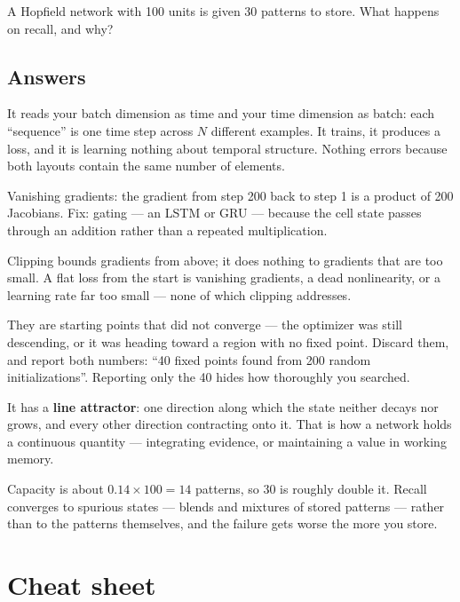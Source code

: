 \documentclass[11pt]{article}
\begin{document}
 A Hopfield network with 100 units is given 30 patterns to store. What
happens on recall, and why?

\subsection*{Answers}

 It reads your batch dimension as time and your time dimension as batch:
each ``sequence'' is one time step across $N$ different examples. It trains, it
produces a loss, and it is learning nothing about temporal structure. Nothing
errors because both layouts contain the same number of elements.

 Vanishing gradients: the gradient from step 200 back to step 1 is a
product of 200 Jacobians. Fix: gating --- an LSTM or GRU --- because the cell state
passes through an addition rather than a repeated multiplication.

 Clipping bounds gradients from above; it does nothing to gradients that
are too small. A flat loss from the start is vanishing gradients, a dead
nonlinearity, or a learning rate far too small --- none of which clipping
addresses.

 They are starting points that did not converge --- the optimizer was
still descending, or it was heading toward a region with no fixed point. Discard
them, and report both numbers: ``40 fixed points found from 200 random
initializations''. Reporting only the 40 hides how thoroughly you searched.

 It has a \textbf{line attractor}: one direction along which the state
neither decays nor grows, and every other direction contracting onto it. That is
how a network holds a continuous quantity --- integrating evidence, or
maintaining a value in working memory.

 Capacity is about $0.14 \times 100 = 14$ patterns, so 30 is roughly
double it. Recall converges to spurious states --- blends and mixtures of stored
patterns --- rather than to the patterns themselves, and the failure gets worse
the more you store.

\section*{Cheat sheet}
\end{document}
